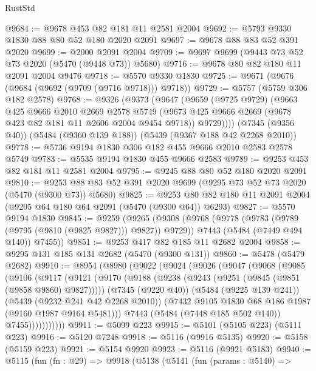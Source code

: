 \begin{lexlean}{RustStd}
\begin{coremodule}
@9684 := @9678 @453 @82 @181 @11 @2581 @2004
@9692 := @5793 @9330 @1830 @88 @80 @52 @180 @2020 @2091
@9697 := @9678 @88 @83 @52 @391 @2020
@9699 := @2000 @2091 @2004
@9709 := @9697 @9699 (@9443 @73 @52 @73 @2020 (@5470 (@9448 @73)) @5680)
@9716 := @9678 @80 @82 @180 @11 @2091 @2004 @9476
@9718 := @5570 @9330 @1830
@9725 := @9671 (@9676 (@9684 (@9692 (@9709 (@9716 @9718))) @9718))
@9729 := @5757 (@5759 @306 @182 @2578)
@9768 := @9326
    (@9373
      (@9647
        (@9659
          (@9725 @9729)
          (@9663
            @425
            @9666
            @2010
            @2669
            @2578
            @5749
            (@9673 @425 @9666 @2669 (@9678 @423 @82 @181 @11 @2606 @2004 @9454 @9718))
            @9729))))
    (@7345 (@9356 @40))
    (@5484 (@9360 @139 @188))
    (@5439 (@9367 @188 @42 @2268 @2010))
@9778 := @5736 @9194 @1830 @306 @182 @455 @9666 @2010 @2583 @2578 @5749
@9783 := @5535 @9194 @1830 @455 @9666 @2583
@9789 := @9253 @453 @82 @181 @11 @2581 @2004
@9795 := @9245 @88 @80 @52 @180 @2020 @2091
@9810 := @9253 @88 @83 @52 @391 @2020 @9699 (@9295 @73 @52 @73 @2020 (@5470 (@9300 @73)) @5680)
@9825 := @9253 @80 @82 @180 @11 @2091 @2004 (@9295 @64 @180 @64 @2091 (@5470 (@9300 @64)) @6293)
@9827 := @5570 @9194 @1830
@9845 := @9259
    (@9265
      (@9308
        (@9768 (@9778 (@9783 (@9789 (@9795 (@9810 (@9825 @9827))) @9827)) @9729))
        @7443
        (@5484 (@7449 @494 @140))
        @7455))
@9851 := @9253 @417 @82 @185 @11 @2682 @2004
@9858 := @9295 @131 @185 @131 @2682 (@5470 (@9300 @131))
@9860 := @5478 (@5479 @2682)
@9910 := @8954
    (@8980
      (@9022
        (@9024
          (@9026
            (@9047
              (@9068
                (@9085
                  (@9106
                    (@9117
                      (@9121
                        (@9170
                          (@9188
                            (@9238 (@9243 (@9251 (@9845 (@9851 (@9858 @9860) @9827)))))
                            (@7345 (@9220 @40))
                            (@5484 (@9225 @139 @241))
                            (@5439 (@9232 @241 @42 @2268 @2010))
                            (@7432 @9105 @1830 @68 @186 @1987 (@9160 @1987 @9164 @5481)))
                          @7443
                          (@5484 (@7448 @185 @502 @140))
                          @7455)))))))))))
@9911 := @5099 @223
@9915 := @5101 (@5105 @223) (@5111 @223)
@9916 := @5120 @7248
@9918 := @5116 (@9916 @5135)
@9920 := @5158 (@5159 @223)
@9921 := @5154 @9920
@9923 := @5116 (@9921 @5183)
@9940 := @5115
    (fun (fn : @29) =>
    @9918
      (@5138
        (@5141
          (fun (params : @5140) =>

\end{coremodule}
\end{lexlean}
